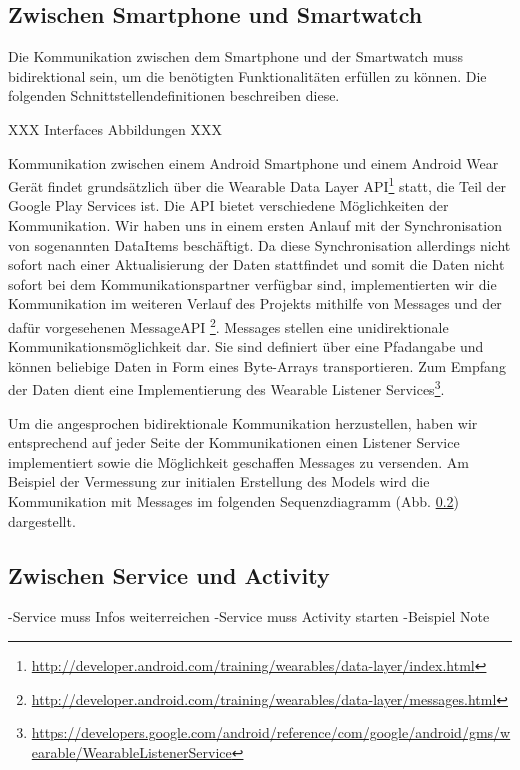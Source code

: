 \subsection{Zwischen Smartphone und Smartwatch}
Die Kommunikation zwischen dem Smartphone und der Smartwatch muss bidirektional sein, um die benötigten Funktionalitäten erfüllen zu können. Die folgenden Schnittstellendefinitionen beschreiben diese.

XXX Interfaces Abbildungen XXX

Kommunikation zwischen einem Android Smartphone und einem Android Wear Gerät findet grundsätzlich über die Wearable Data Layer API\footnote{\url{http://developer.android.com/training/wearables/data-layer/index.html}} statt, die Teil der Google Play Services ist. Die API bietet verschiedene Möglichkeiten der Kommunikation. Wir haben uns in einem ersten Anlauf mit der Synchronisation von sogenannten DataItems beschäftigt. Da diese Synchronisation allerdings nicht sofort nach einer Aktualisierung der Daten stattfindet und somit die Daten nicht sofort bei dem Kommunikationspartner verfügbar sind, implementierten wir die Kommunikation im weiteren Verlauf des Projekts mithilfe von Messages und der dafür vorgesehenen MessageAPI \footnote{\url{http://developer.android.com/training/wearables/data-layer/messages.html}}. Messages stellen eine unidirektionale Kommunikationsmöglichkeit dar. Sie sind definiert über eine Pfadangabe und können beliebige Daten in Form eines Byte-Arrays transportieren. Zum Empfang der Daten dient eine Implementierung des Wearable Listener Services\footnote{\url{https://developers.google.com/android/reference/com/google/android/gms/wearable/WearableListenerService}}.

Um die angesprochen bidirektionale Kommunikation herzustellen, haben wir entsprechend auf jeder Seite der Kommunikationen einen Listener Service implementiert sowie die Möglichkeit geschaffen Messages zu versenden. Am Beispiel der Vermessung zur initialen Erstellung des Models wird die Kommunikation mit Messages im folgenden Sequenzdiagramm (Abb. \ref{}) dargestellt.



\subsection{Zwischen Service und Activity}
-Service muss Infos weiterreichen
-Service muss Activity starten
-Beispiel Note

